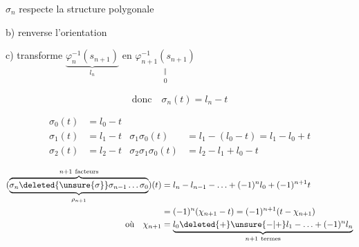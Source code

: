 

$\sigma_n$ \quad {} respecte la structure polygonale

b) renverse l'orientation

c) transforme $\underbrace{\varphi_n^{-1}(s_{n+1})}_{l_n}$ en $\underset{\substack{\Vert\\0}}{\varphi_{n+1}^{-1}(s_{n+1})}$

\[ \text{donc}\quad \sigma_n(t)=l_n-t \]

\[ \begin{aligned}
\sigma_0(t)&=l_0-t\\
\sigma_1(t)&=l_1-t &\sigma_1\sigma_0(t)&=l_1-(l_0-t)=l_1-l_0+t\\
\sigma_2(t)&=l_2-t &\sigma_2\sigma_1\sigma_0(t)&=l_2-l_1+l_0-t
\end{aligned} \]

\[ \begin{aligned}
(\underbrace{\overbrace{\sigma_n\deleted{\unsure{\sigma}}\sigma_{n-1}\ldots\sigma_0}^{n+1\ \text{facteurs}}}_{\rho_{n+1}})(t)&=l_n-l_{n-1}-\ldots+(-1)^n l_0+(-1)^{n+1}t\\
&=(-1)^n(\chi_{n+1}-t)=(-1)^{n+1}(t-\chi_{n+1})\\
\text{où}\quad \chi_{n+1}&=\underbrace{l_0\deleted{+}\unsure{-|+}l_1-\ldots+(-1)^n l_n}_{n+1\ \text{termes}}
\end{aligned} \]
